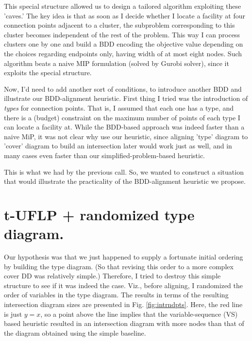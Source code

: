 \documentclass[11pt]{article}
\begin{document}
This special structure allowed us to design a tailored algorithm exploiting
these 'caves.' The key idea is that as soon as I decide whether I locate a
facility at four connection points adjacent to a cluster, the subproblem
corresponding to this cluster becomes independent of the rest of the problem.
This way I can process clusters one by one and build a BDD encoding the
objective value depending on the choices regarding endpoints only, having width
of at most eight nodes. Such algorithm beats a naive MIP formulation (solved by
Gurobi solver), since it exploits the special structure.

Now, I'd need to add another sort of conditions, to introduce another BDD and
illustrate our BDD-alignment heuristic. First thing I tried was the introduction
of \emph{types} for connection points. That is, I assumed that each one has a type,
and there is a (budget) constraint on the maximum number of points of each type
I can locate a facility at. While the BDD-based approach was indeed faster than
a naive MiP, it was not clear why use our heuristic, since aligning 'type'
diagram to 'cover' diagram to build an intersection later would work just as
well, and in many cases even faster than our simplified-problem-based heuristic.

This is what we had by the previous call. So, we wanted to construct a situation
that would illustrate the practicality of the BDD-alignment heuristic we propose.

\section{t-UFLP + randomized type diagram.}
\label{sec:orgc5dc98a}
Our hypothesis was that we just happened to supply a fortunate initial ordering
by building the type diagram. (So that revising this order to a more complex
cover DD was relatively simple.) Therefore, I tried to destroy this simple
structure to see if it was indeed the case. Viz., before aligning, I randomized
the order of variables in the type diagram. The results in terms of the
resulting intersection diagram sizes are presented in Fig. \ref{fig:intrndpts}.
Here, the red line is just \(y=x\), so a point above the line implies that the
variable-sequence (VS) based heuristic resulted in an intersection diagram with
more nodes than that of the diagram obtained using the simple baseline.
\end{document}
